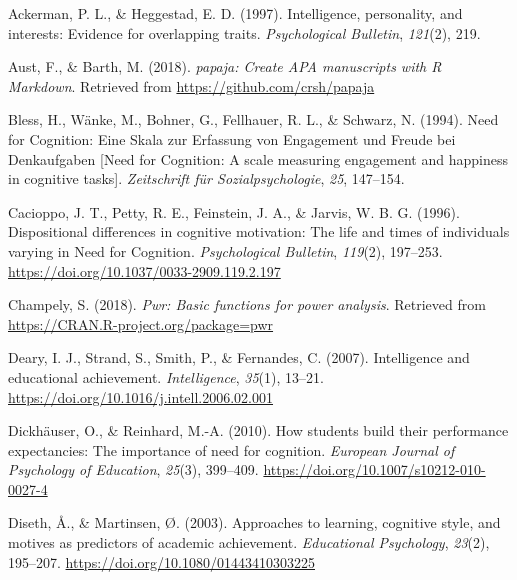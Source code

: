 \documentclass[
  man]{apa6}
\newlength{\cslhangindent}
\newlength{\cslentryspacingunit} %
\newenvironment{CSLReferences}[2] %
 {%
  \setlength{\parindent}{0pt}
  \ifodd #1
  \let\oldpar\par
  \def\par{\hangindent=\cslhangindent\oldpar}
  \fi
  \setlength{\parskip}{#2\cslentryspacingunit}
 }%
 {}
\begin{document}
\hypertarget{refs}{}
\begin{CSLReferences}{1}{0}
\leavevmode{}%
Ackerman, P. L., \& Heggestad, E. D. (1997). Intelligence, personality, and interests: Evidence for overlapping traits. \emph{Psychological Bulletin}, \emph{121}(2), 219.

\leavevmode{}%
Aust, F., \& Barth, M. (2018). \emph{{papaja}: {Create} {APA} manuscripts with {R Markdown}}. Retrieved from \url{https://github.com/crsh/papaja}

\leavevmode{}%
Bless, H., Wänke, M., Bohner, G., Fellhauer, R. L., \& Schwarz, N. (1994). Need for {C}ognition: {E}ine {S}kala zur {E}rfassung von {E}ngagement und {F}reude bei {D}enkaufgaben {[}{N}eed for {C}ognition: A scale measuring engagement and happiness in cognitive tasks{]}. \emph{Zeitschrift {f}{ü}r Sozialpsychologie}, \emph{25}, 147--154.

\leavevmode{}%
Cacioppo, J. T., Petty, R. E., Feinstein, J. A., \& Jarvis, W. B. G. (1996). Dispositional differences in cognitive motivation: The life and times of individuals varying in {N}eed for {C}ognition. \emph{Psychological Bulletin}, \emph{119}(2), 197--253. \url{https://doi.org/10.1037/0033-2909.119.2.197}

\leavevmode{}%
Champely, S. (2018). \emph{Pwr: Basic functions for power analysis}. Retrieved from \url{https://CRAN.R-project.org/package=pwr}

\leavevmode{}%
Deary, I. J., Strand, S., Smith, P., \& Fernandes, C. (2007). Intelligence and educational achievement. \emph{Intelligence}, \emph{35}(1), 13--21. \url{https://doi.org/10.1016/j.intell.2006.02.001}

\leavevmode{}%
Dickhäuser, O., \& Reinhard, M.-A. (2010). How students build their performance expectancies: The importance of need for cognition. \emph{European Journal of Psychology of Education}, \emph{25}(3), 399--409. \url{https://doi.org/10.1007/s10212-010-0027-4}

\leavevmode{}%
Diseth, Å., \& Martinsen, Ø. (2003). Approaches to learning, cognitive style, and motives as predictors of academic achievement. \emph{Educational Psychology}, \emph{23}(2), 195--207. \url{https://doi.org/10.1080/01443410303225}


\end{CSLReferences}
\end{document}
